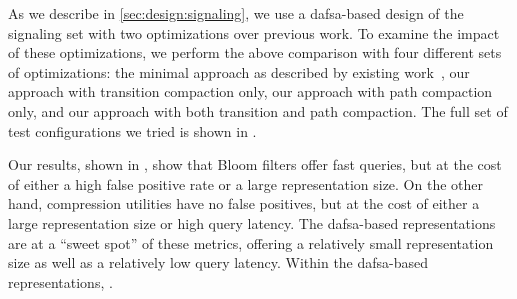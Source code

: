 As we describe in \autoref{sec:design:signaling}, we use a \ac{dafsa}-based
design of the signaling set with two optimizations over previous work. To
examine the impact of these optimizations, we perform the above comparison with
four different sets of optimizations: the minimal approach as described by
existing work~\cite{daciuk2012smaller}, our approach with transition compaction
only, our approach with path compaction only, and our approach with both
transition and path compaction. The full set of test configurations we tried
is shown in .

Our results, shown in , show that Bloom filters offer fast
queries, but at the cost of either a high false positive rate or a large
representation size. On the other hand, compression utilities have no false
positives, but at the cost of either a large representation size or high query
latency. The \ac{dafsa}-based representations are at a ``sweet spot'' of these
metrics, offering a relatively small representation size as well as a relatively
low query latency. Within the \ac{dafsa}-based representations, .



